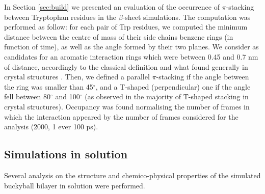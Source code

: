 In Section \ref{sec:build} we presented an evaluation of the occurrence of $\pi$-stacking between Tryptophan residues in the $\beta$-sheet simulations. The computation was performed as follow: for each pair of Trp residues, we computed the minimum distance between the centre of mass of their side chains benzene rings (in function of time), as well as the angle formed by their two planes. We consider as candidates for an aromatic interaction rings which were between 0.45 and 0.7 nm of distance, accordingly to the classical definition \citep{Burley1986} and what found generally in crystal structures \citep{Anjana2012}. 
%
Then, we defined a parallel $\pi$-stacking if the angle between the ring was smaller than 45$^{\circ}$, and a T-shaped (perpendicular) one if the angle fell between 80$^{\circ}$ and 100$^{\circ}$ (as observed in the majority of T-shaped stacking in crystal structures). Occupancy was found normalising the number of frames in which the interaction appeared by the number of frames considered for the analysis (2000, 1 ever 100 ps).    
    
\subsection{Simulations in solution}
Several analysis on the structure and chemico-physical properties of the simulated buckyball bilayer in solution were performed.

